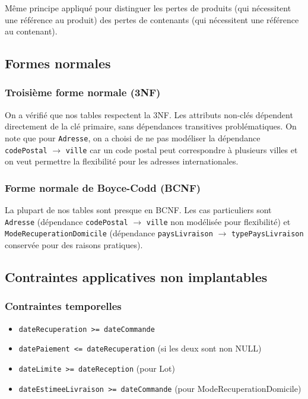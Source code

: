 Même principe appliqué pour distinguer les pertes de produits (qui nécessitent une référence au produit) des pertes de contenants (qui nécessitent une référence au contenant).

\subsection{Formes normales}

\subsubsection{Troisième forme normale (3NF)}

On a vérifié que nos tables respectent la 3NF. Les attributs non-clés dépendent directement de la clé primaire, sans dépendances transitives problématiques. On note que pour \texttt{Adresse}, on a choisi de ne pas modéliser la dépendance \texttt{codePostal} $\rightarrow$ \texttt{ville} car un code postal peut correspondre à plusieurs villes et on veut permettre la flexibilité pour les adresses internationales.

\subsubsection{Forme normale de Boyce-Codd (BCNF)}

La plupart de nos tables sont presque en BCNF. Les cas particuliers sont \texttt{Adresse} (dépendance \texttt{codePostal} $\rightarrow$ \texttt{ville} non modélisée pour flexibilité) et \texttt{ModeRecuperationDomicile} (dépendance \texttt{paysLivraison} $\rightarrow$ \texttt{typePaysLivraison} conservée pour des raisons pratiques).

\subsection{Contraintes applicatives non implantables}

\subsubsection{Contraintes temporelles}

\begin{itemize}
    \item \texttt{dateRecuperation >= dateCommande}
    \item \texttt{datePaiement <= dateRecuperation} (si les deux sont non NULL)
    \item \texttt{dateLimite >= dateReception} (pour Lot)
    \item \texttt{dateEstimeeLivraison >= dateCommande} (pour ModeRecuperationDomicile)
\end{itemize}

